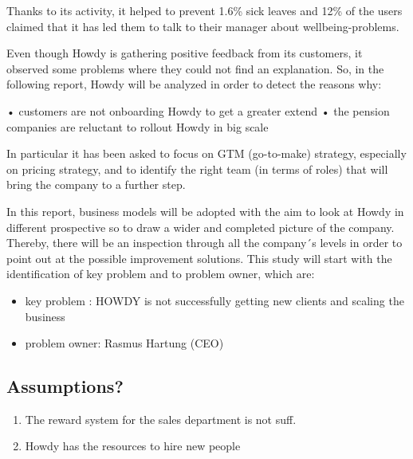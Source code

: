 \noindent Thanks to its activity, it helped to prevent 1.6\% sick leaves and 12\% of the users claimed that it has led them to talk to their manager about wellbeing-problems. \cite{howdywebsite}  

\noindent Even though Howdy is gathering positive feedback from its customers, it observed some problems where they could not find an explanation. So, in the following report, Howdy will be analyzed in order to detect the reasons why:

•	customers are not onboarding Howdy to get a greater extend
•	the pension companies are reluctant to rollout Howdy in big scale

\noindent In particular it has been asked to focus on GTM (go-to-make) strategy, especially on pricing strategy, and to identify the right team (in terms of roles) that will bring the company to a further step.\cite[s.39]{oneofthepresentations}

\noindent In this report, business models will be adopted with the aim to look at Howdy in different prospective so to draw a wider and completed picture of the company.  Thereby, there will be an inspection through all the company´s levels in order to point out at the possible improvement solutions. This study will start with the identification of key problem and to problem owner, which are:


\begin{itemize}
  \item key problem : HOWDY is not successfully getting new clients and scaling the business\cite[s.39]{oneofthepresentations}
  \item problem owner: Rasmus Hartung (CEO)\cite[s.5]{oneofthepresentations}
\end{itemize}





\subsection{Assumptions?}

\begin{enumerate}
    \item The reward system for the sales department is not suff.
    \item Howdy has the resources to hire new people 
\end{enumerate}



